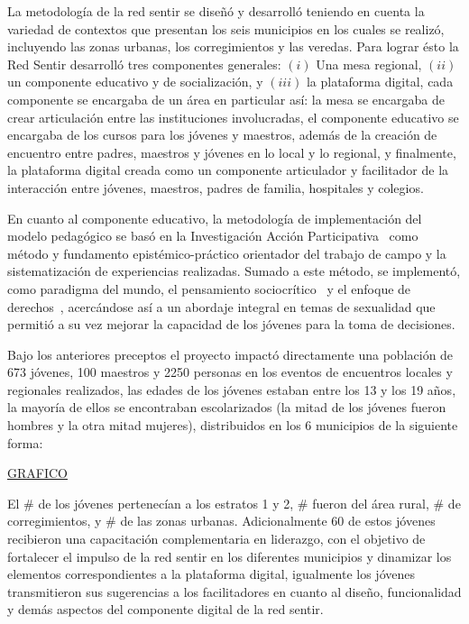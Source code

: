 \documentclass[journal,transmag]{IEEEtran}
\begin{document}
La metodología de la red sentir se diseñó y desarrolló teniendo en cuenta la variedad de contextos que presentan los seis municipios en los cuales se realizó, incluyendo las zonas urbanas, los corregimientos y las veredas. Para lograr ésto la Red Sentir desarrolló tres componentes generales: $(i)$ Una mesa regional, $(ii)$ un componente educativo y de socialización, y $(iii)$ la plataforma digital, cada componente se encargaba de un área en particular así: la mesa se encargaba de crear articulación entre las instituciones  involucradas, el componente educativo se encargaba de los cursos para los jóvenes y maestros, además de la creación de encuentro entre padres, maestros y jóvenes en lo local y lo regional, y finalmente, la plataforma digital creada como un componente articulador y facilitador de la interacción entre jóvenes, maestros, padres de familia, hospitales y colegios.

En cuanto al componente educativo, la metodología de implementación del modelo pedagógico se basó en la Investigación Acción Participativa~\cite{fals2008socialismo} como método y fundamento epistémico-práctico orientador del trabajo de campo y la sistematización de experiencias realizadas. Sumado a este método, se implementó, como paradigma del mundo, el pensamiento sociocrítico~\cite{stanley1991postmodern} y el enfoque de derechos~\cite{unesco}, acercándose así a un abordaje integral en temas de sexualidad que permitió a su vez mejorar la capacidad de los jóvenes para la toma de decisiones.

Bajo los anteriores preceptos el proyecto impactó directamente una población de 673 jóvenes, 100 maestros y 2250 personas en los eventos de encuentros locales y regionales realizados, las edades de los jóvenes estaban entre los 13 y los 19 años, la mayoría de ellos se encontraban escolarizados (la mitad de los jóvenes fueron hombres y la otra mitad mujeres), distribuidos en los 6 municipios de la siguiente forma: 

\underline{GRAFICO}

El $\#$ de los jóvenes pertenecían a los estratos 1 y 2, $\#$ fueron del área rural, $\#$ de corregimientos, y $\#$ de las zonas urbanas. Adicionalmente 60 de estos jóvenes recibieron una capacitación complementaria en liderazgo, con el objetivo de fortalecer el impulso de la red sentir en los diferentes municipios y dinamizar los elementos correspondientes a la plataforma digital, igualmente los jóvenes transmitieron sus sugerencias a los facilitadores en cuanto al diseño, funcionalidad y demás aspectos del componente digital de la red sentir.
\end{document}
